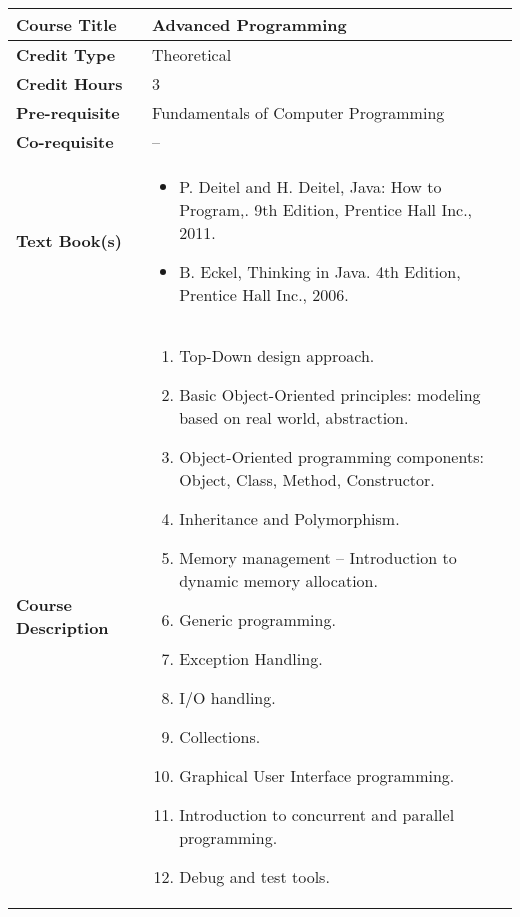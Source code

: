 \documentclass[11pt]{article}
\begin{document}
\begin{table}[h!]
\begin{tabular}{|l|l|}
\hline
\textbf{Course Title}       &   Advanced Programming\\ \hline
\textbf{Credit Type}        &  Theoretical \\ \hline
\textbf{Credit Hours}       & 3 \\ \hline
\textbf{Pre-requisite}       &  Fundamentals of Computer Programming\\ \hline
\textbf{Co-requisite}       &  --\\ \hline
\textbf{Text Book(s)}       & \begin{minipage}{.70\textwidth}
\begin{itemize} \itemsep-0.4em
	\vspace{3mm}
	\item P. Deitel and H. Deitel, Java: How to Program,. 9th Edition, Prentice Hall Inc., 2011.
	\item B. Eckel, Thinking in Java. 4th Edition, Prentice Hall Inc., 2006.
	\vspace{3mm}
\end{itemize}
\end{minipage}\\ \hline
\textbf{Course Description} & \begin{minipage}{.70\textwidth}
\vspace{3mm}
\begin{enumerate}
  \item Top-Down design approach.
  \item Basic Object-Oriented principles: modeling based on real world, abstraction.
  \item Object-Oriented programming components: Object, Class, Method, Constructor.
  \item Inheritance and Polymorphism.
  \item Memory management -- Introduction to dynamic memory allocation.
  \item Generic programming.
  \item Exception Handling.
  \item I/O handling.
  \item Collections.
  \item Graphical User Interface programming.
  \item Introduction to concurrent and parallel programming.
  \item Debug and test tools.
\end{enumerate}
\vspace{3mm}
\end{minipage} \\ \hline
\end{tabular}
\end{table}
\end{document}

